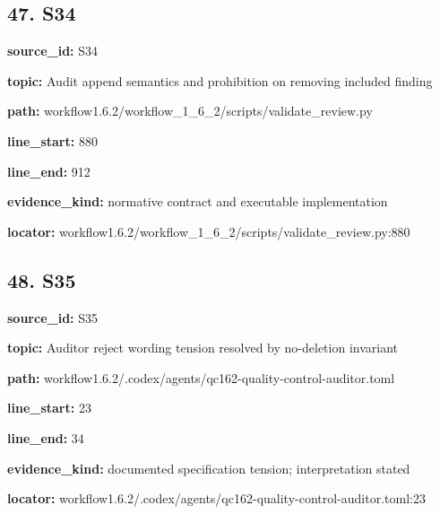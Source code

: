 \documentclass[10pt,a4paper]{article}
\begin{document}
\subsection*{47.\allowbreak{} S34}
\textbf{source\_\allowbreak{}id:} S34\par
\textbf{topic:} Audit append semantics and prohibition on removing included finding\par
\textbf{path:} workflow1.\allowbreak{}6.\allowbreak{}2/\allowbreak{}workflow\_\allowbreak{}1\_\allowbreak{}6\_\allowbreak{}2/\allowbreak{}scripts/\allowbreak{}validate\_\allowbreak{}review.\allowbreak{}py\par
\textbf{line\_\allowbreak{}start:} 880\par
\textbf{line\_\allowbreak{}end:} 912\par
\textbf{evidence\_\allowbreak{}kind:} normative contract and executable implementation\par
\textbf{locator:} workflow1.\allowbreak{}6.\allowbreak{}2/\allowbreak{}workflow\_\allowbreak{}1\_\allowbreak{}6\_\allowbreak{}2/\allowbreak{}scripts/\allowbreak{}validate\_\allowbreak{}review.\allowbreak{}py:880\par
\subsection*{48.\allowbreak{} S35}
\textbf{source\_\allowbreak{}id:} S35\par
\textbf{topic:} Auditor reject wording tension resolved by no-\allowbreak{}deletion invariant\par
\textbf{path:} workflow1.\allowbreak{}6.\allowbreak{}2/\allowbreak{}.\allowbreak{}codex/\allowbreak{}agents/\allowbreak{}qc162-\allowbreak{}quality-\allowbreak{}control-\allowbreak{}auditor.\allowbreak{}toml\par
\textbf{line\_\allowbreak{}start:} 23\par
\textbf{line\_\allowbreak{}end:} 34\par
\textbf{evidence\_\allowbreak{}kind:} documented specification tension; interpretation stated\par
\textbf{locator:} workflow1.\allowbreak{}6.\allowbreak{}2/\allowbreak{}.\allowbreak{}codex/\allowbreak{}agents/\allowbreak{}qc162-\allowbreak{}quality-\allowbreak{}control-\allowbreak{}auditor.\allowbreak{}toml:23\par
\end{document}
